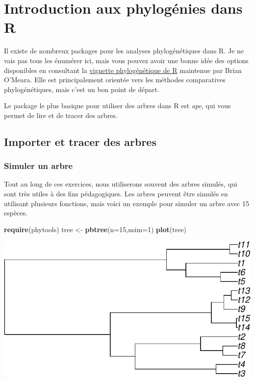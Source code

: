 \documentclass[
]{book}
\newenvironment{Shaded}{\begin{snugshade}}{\end{snugshade}}
\newcommand{\AttributeTok}[1]{\textcolor[rgb]{0.13,0.29,0.53}{#1}}
\newcommand{\DecValTok}[1]{\textcolor[rgb]{0.00,0.00,0.81}{#1}}
\newcommand{\FunctionTok}[1]{\textcolor[rgb]{0.13,0.29,0.53}{\textbf{#1}}}
\newcommand{\NormalTok}[1]{#1}
\newcommand{\OtherTok}[1]{\textcolor[rgb]{0.56,0.35,0.01}{#1}}
\begin{document}
\chapter{Introduction aux phylogénies dans R}\label{trees}

Il existe de nombreux packages pour les analyses phylogénétiques dans R. Je ne vais pas tous les énumérer ici, mais vous pouvez avoir une bonne idée des options disponibles en consultant la \href{http://cran.r-project.org/web/views/Phylogenetics.html}{vignette phylogénétique de R} maintenue par Brian O'Meara. Elle est principalement orientée vers les méthodes comparatives phylogénétiques, mais c'est un bon point de départ.

Le package le plus basique pour utiliser des arbres dans R est \emph{ape}, qui vous permet de lire et de tracer des arbres.

\section{Importer et tracer des arbres}\label{importer-et-tracer-des-arbres}

\subsection{Simuler un arbre}\label{simuler-un-arbre}

Tout au long de ces exercices, nous utiliserons souvent des arbres simulés, qui sont très utiles à des fins pédagogiques. Les arbres peuvent être simulés en utilisant plusieurs fonctions, mais voici un exemple pour simuler un arbre avec 15 espèces.

\begin{Shaded}
\begin{Highlighting}[]
\FunctionTok{require}\NormalTok{(phytools)}
\NormalTok{tree }\OtherTok{\textless{}{-}} \FunctionTok{pbtree}\NormalTok{(}\AttributeTok{n=}\DecValTok{15}\NormalTok{,}\AttributeTok{nsim=}\DecValTok{1}\NormalTok{)}
\FunctionTok{plot}\NormalTok{(tree)}
\end{Highlighting}
\end{Shaded}

\includegraphics{pcm-workshop_files/figure-latex/Simulate Pure-Birth Tree-1.pdf}
\end{document}
